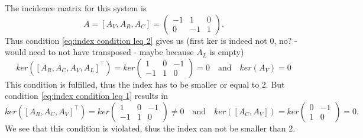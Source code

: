 	The incidence matrix for this system is
	\begin{displaymath}
		A = [A_V, A_R, A_C] = 
		\left(
		\begin{matrix}
			-1 & 1 & 0 \\
			0 & -1 & 1 
		\end{matrix}
		\right).
	\end{displaymath} 
	Thus condition \eqref{eq:index condition leq 2} gives us (first ker is indeed not 0, no? - would need to not have transposed - maybe because $A_L$ is empty)
	\begin{displaymath}
		ker([A_R, A_C, A_V, A_L]^\top) = ker
		\left(
		\begin{matrix}
			 1 & 0 & -1\\
			-1 & 1 & 0
		\end{matrix}
		\right) = 0 
		\quad \text{and} \quad 
		ker(A_V) = 0
	\end{displaymath}
	This condition is fulfilled, thus the index has to be smaller or equal to 2.
	But condition \eqref{eq:index condition leq 1} results in
	\begin{displaymath}
		ker([A_R, A_C, A_V]^\top) = ker\left(
		\begin{matrix}
			1 & 0 & -1\\
			-1 & 1 & 0
		\end{matrix}
		\right) \neq 0
		\quad \text{and} \quad
		ker([A_C, A_V]) = ker
		\left(
		\begin{matrix}
			0 & -1\\
			1 & 0
		\end{matrix}
		\right) = 0.
	\end{displaymath}
	We see that this condition is violated, thus the index can not be smaller than $2$.
	

